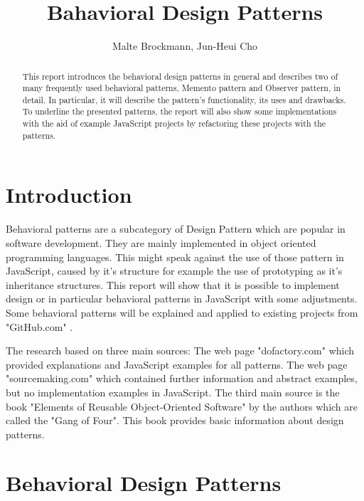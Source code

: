 \documentclass{bioinfo}
\begin{document}

\title[short Title]{Bahavioral Design Patterns}
\author[Malte Brockmann, Jun-Heui Cho]{Malte Brockmann, Jun-Heui Cho}
\address{Department of Bioinformatics, Technische Universit\"at M\"unchen}

\history{}

\editor{}

\maketitle

\begin{abstract}
This report introduces the behavioral design patterns in general and describes two of many frequently used behavioral patterns, Memento pattern and Observer pattern, in detail. In particular, it will describe the pattern's functionality, its uses and drawbacks. To underline the presented patterns, the report will also show some implementations with the aid of example JavaScript projects by refactoring these projects with the patterns.
\end{abstract}

\section{Introduction}
Behavioral patterns are a subcategory of Design Pattern which are popular in software development. They are mainly implemented in object oriented programming languages. This might speak against the use of those pattern in JavaScript, caused by it's structure for example the use of prototyping as it's  inheritance structures. This report will show that it is possible to implement design or in particular behavioral patterns in JavaScript with some adjustments. Some behavioral patterns will be explained and applied to existing projects from "GitHub.com" \cite{github}.

The research  based on three main sources: The web page "dofactory.com" \cite{dofac} which provided explanations and JavaScript examples for all patterns. The web page "sourcemaking.com" \cite{sourcem} which contained further information  and abstract examples, but no implementation examples in JavaScript. The third main source is the book "Elements of Reusable Object-Oriented Software" by the authors which are called the "Gang of Four". \cite{gang4} This book provides basic information about design patterns. 

\section{Behavioral Design Patterns}
\end{document}
